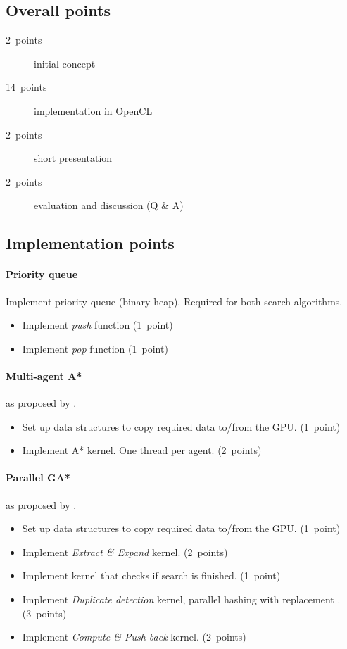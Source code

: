 \documentclass[
    paper = a4,
    twocolumn = true,
    DIV = calc
]{scrartcl}
\begin{document}
\subsection{Overall points}

\begin{description}
    \item[2~points] initial concept
    \item[14~points] implementation in OpenCL
    \item[2~points] short presentation
    \item[2~points] evaluation and discussion (Q \& A)
\end{description}


\subsection{Implementation points}
\label{sec:points}

\paragraph{Priority queue} Implement priority queue (binary heap). Required for both search algorithms.
\begin{itemize}
    \item Implement \emph{push} function (1~point)
    \item Implement \emph{pop} function (1~point)
\end{itemize}

\paragraph{Multi-agent A*} as proposed by \cite{silva2011gpu}.
\begin{itemize}
    \item Set up data structures to copy required data to/from the GPU. (1~point)
    \item Implement A* kernel. One thread per agent. (2~points)
\end{itemize}

\paragraph{Parallel GA*} as proposed by \cite{zhou2015massively}.
\begin{itemize}
    \item Set up data structures to copy required data to/from the GPU. (1~point)
    \item Implement \emph{Extract \& Expand} kernel. (2~points)
    \item Implement kernel that checks if search is finished. (1~point)
    \item Implement \emph{Duplicate detection} kernel, parallel hashing with replacement \cite{zhou2015appendix}. (3~points)
    \item Implement \emph{Compute \& Push-back} kernel. (2~points)
\end{itemize}



\end{document}
